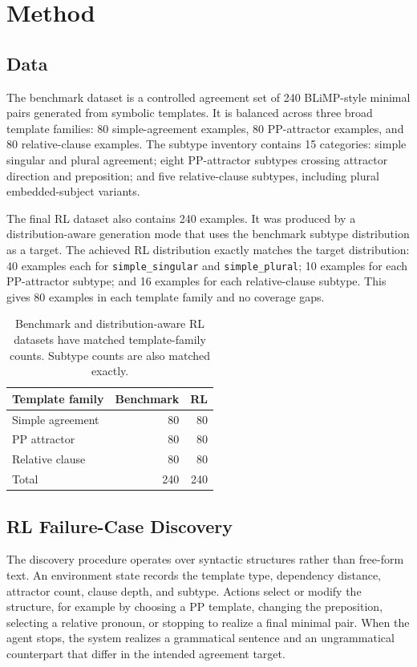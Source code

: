 \documentclass[11pt]{article}
\begin{document}
\section{Method}

\subsection{Data}

The benchmark dataset is a controlled agreement set of 240 BLiMP-style minimal
pairs generated from symbolic templates. It is balanced across three broad
template families: 80 simple-agreement examples, 80 PP-attractor examples, and
80 relative-clause examples. The subtype inventory contains 15 categories:
simple singular and plural agreement; eight PP-attractor subtypes crossing
attractor direction and preposition; and five relative-clause subtypes,
including plural embedded-subject variants.

The final RL dataset also contains 240 examples. It was produced by a
distribution-aware generation mode that uses the benchmark subtype distribution
as a target. The achieved RL distribution exactly matches the target
distribution: 40 examples each for \texttt{simple\_singular} and
\texttt{simple\_plural}; 10 examples for each PP-attractor subtype; and 16
examples for each relative-clause subtype. This gives 80 examples in each
template family and no coverage gaps.

\begin{table}[t]
\centering
\small
\begin{tabular}{lrr}
\toprule
Template family & Benchmark & RL \\
\midrule
Simple agreement & 80 & 80 \\
PP attractor & 80 & 80 \\
Relative clause & 80 & 80 \\
\midrule
Total & 240 & 240 \\
\bottomrule
\end{tabular}
\caption{Benchmark and distribution-aware RL datasets have matched
template-family counts. Subtype counts are also matched exactly.}
\label{tab:data}
\end{table}

\subsection{RL Failure-Case Discovery}

The discovery procedure operates over syntactic structures rather than free-form text.
An environment state records the template type, dependency distance, attractor
count, clause depth, and subtype. Actions select or modify the structure, for
example by choosing a PP template, changing the preposition, selecting a
relative pronoun, or stopping to realize a final minimal pair. When the agent
stops, the system realizes a grammatical sentence and an ungrammatical
counterpart that differ in the intended agreement target.
\end{document}
